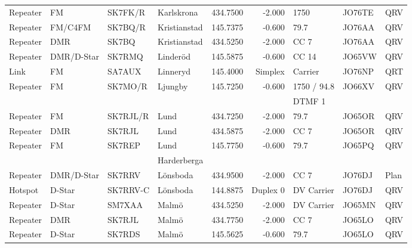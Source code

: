 \begin{longtable}{llllrrlll}
Repeater & FM              & SK7FK/R  & Karlskrona   & 434.7500     & -2.000     & 1750         & JO76TE      & QRV      \\
Repeater & FM/C4FM         & SK7BQ/R  & Kristianstad & 145.7375     & -0.600     & 79.7         & JO76AA      & QRV      \\
Repeater & DMR             & SK7BQ    & Kristianstad & 434.5250     & -2.000     & CC 7         & JO76AA      & QRV      \\
Repeater & DMR/D-Star      & SK7RMQ   & Linderöd     & 145.5875     & -0.600     & CC 14        & JO65VW      & QRV      \\
Link     & FM              & SA7AUX   & Linneryd     & 145.4000     & Simplex    & Carrier      & JO76NP      & QRT      \\
Repeater & FM              & SK7MO/R  & Ljungby      & 145.7250     & -0.600     & 1750 / 94.8  & JO66XV      & QRV      \\
         &                 &          &              &              &            & DTMF 1       &             &          \\
Repeater & FM              & SK7RJL/R & Lund         & 434.7250     & -2.000     & 79.7         & JO65OR      & QRV      \\
Repeater & DMR             & SK7RJL   & Lund         & 434.5875     & -2.000     & CC 7         & JO65OR      & QRV      \\
Repeater & FM              & SK7REP   & Lund         & 145.7750     & -0.600     & 79.7         & JO65PQ      & QRV      \\
         &                 &          & Harderberga  &              &            &              &             &          \\
Repeater & DMR/D-Star      & SK7RRV   & Lönsboda     & 434.9500     & -2.000     & CC 7         & JO76DJ      & Plan     \\
Hotspot  & D-Star          & SK7RRV-C & Lönsboda     & 144.8875     & Duplex 0   & DV Carrier   & JO76DJ      & QRV      \\
Repeater & D-Star          & SM7XAA   & Malmö        & 434.5250     & -2.000     & DV Carrier   & JO65MN      & QRV      \\
Repeater & DMR             & SK7RJL   & Malmö        & 434.7750     & -2.000     & CC 7         & JO65LO      & QRV      \\
Repeater & D-Star          & SK7RDS   & Malmö        & 145.5625     & -0.600     & 79.7         & JO65LO      & QRV      \\

\end{longtable}
